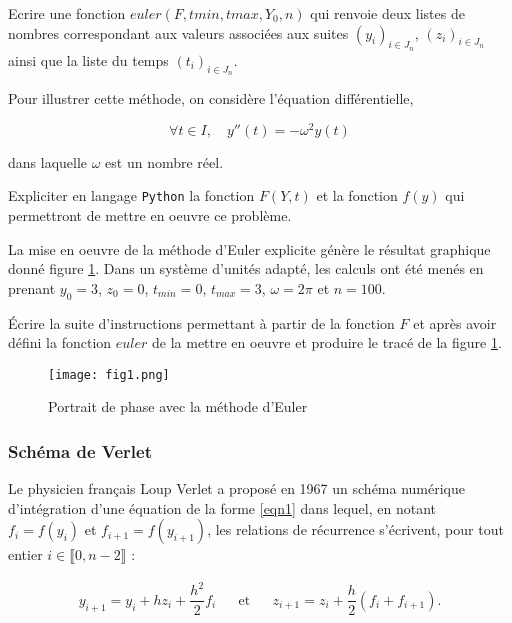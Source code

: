 \question{} Ecrire une fonction $euler(F, tmin, tmax, Y_0, n)$ qui renvoie deux listes de nombres correspondant aux valeurs associées aux suites $\left(y_i\right)_{i\in J_n}$, $\left(z_i\right)_{i\in J_n}$ ainsi que la liste du temps $\left(t_i\right)_{i\in J_n}$.

\bigskip{}

Pour illustrer cette méthode, on considère l'équation différentielle, 

\begin{equation}\label{eqn5}
\forall t\in I,\quad y''(t) = -\omega^2y(t)
\end{equation}

dans laquelle $\omega$ est un nombre réel.

\question{} Expliciter en langage \texttt{Python} la fonction $F(Y,t)$ et la fonction $f(y)$ qui permettront de mettre en oeuvre ce problème.

\bigskip

La mise en oeuvre de la méthode d'Euler explicite génère le résultat graphique donné figure \ref{fig1}. Dans
un système d'unités adapté, les calculs ont été menés en prenant $y_0 = 3$, $z_0 = 0$, $t_{min} = 0$, $t_{max} = 3$, $\omega = 2\pi$ et $n = 100$.

\question{} \'Ecrire la suite d'instructions permettant à partir de la fonction $F$ et après avoir défini la fonction $euler$ de la mettre en oeuvre et produire le tracé de la figure \ref{fig1}. 


\begin{figure}[!h]
\begin{center}
\texttt{[image: fig1.png]}
\caption{Portrait de phase avec la méthode d'Euler\label{fig1}}
\end{center}
\end{figure}


\subsubsection*{Schéma de Verlet}


%

Le physicien français Loup Verlet a proposé en 1967 un schéma numérique d'intégration d'une équation de la forme \eqref{eqn1} dans lequel, en notant $f_i=f(y_i)$ et $f_{i+1}=f(y_{i+1})$, les relations de récurrence s'écrivent, pour tout entier $i\in \llbracket 0,n-2 \rrbracket$ : 

\begin{align}\label{eqn6}
\displaystyle
y_{i+1}=y_i+hz_i+\dfrac{h^2}{2}f_i && \textrm{et} && z_{i+1}=z_i+\dfrac{h}{2}\left(f_i+f_{i+1}\right).
\end{align}

